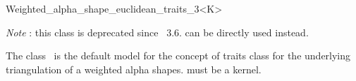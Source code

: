 %
%
%
%
%
%
%
%
%
%



\begin{ccRefClass} {Weighted_alpha_shape_euclidean_traits_3<K>}

\begin{ccDeprecated}
{\em Note} : this class is deprecated since \cgal\ 3.6.  
 can be directly used instead.



\ccDefinition

The class \ccRefName\ is the default  model for the concept
 of traits class for
the underlying triangulation of a weighted alpha shapes.
 must be a kernel.


\ccRefines
{}


\ccIsModel
{}

\end{ccDeprecated}

\end{ccRefClass}
